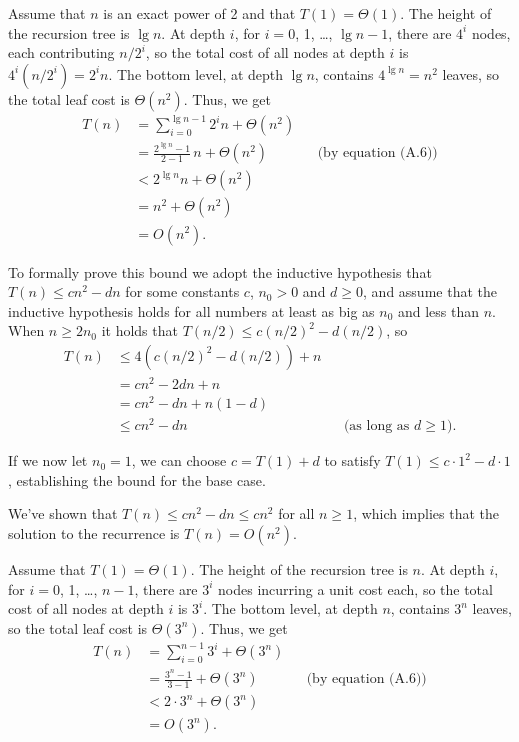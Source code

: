 \subexercise
Assume that $n$ is an exact power of 2 and that $T(1)=\Theta(1)$.
The height of the recursion tree is $\lg n$.
At depth $i$, for $i=0$, 1, \dots, $\lg n-1$, there are $4^i$ nodes, each contributing $n/2^i$, so the total cost of all nodes at depth $i$ is $4^i(n/2^i)=2^in$.
The bottom level, at depth $\lg n$, contains $4^{\lg n}=n^2$ leaves, so the total leaf cost is $\Theta(n^2)$.
Thus, we get
\begin{align*}
    T(n) &= \sum_{i=0}^{\lg n-1}2^in+\Theta(n^2) \\
    &= \frac{2^{\lg n}-1}{2-1}\,n+\Theta(n^2) && \text{(by equation (A.6))} \\[1mm]
    &< 2^{\lg n}n+\Theta(n^2) \\
    &= n^2+\Theta(n^2) \\
    &= O(n^2).
\end{align*}

To formally prove this bound we adopt the inductive hypothesis that $T(n)\le cn^2-dn$ for some constants $c$, $n_0>0$ and $d\ge0$, and assume that the inductive hypothesis holds for all numbers at least as big as $n_0$ and less than $n$.
When $n\ge2n_0$ it holds that $T(n/2)\le c(n/2)^2-d(n/2)$, so
\begin{align*}
    T(n) &\le 4(c(n/2)^2-d(n/2))+n \\
    &= cn^2-2dn+n \\
    &= cn^2-dn+n(1-d) \\
    &\le cn^2-dn && \text{(as long as $d\ge1$)}.
\end{align*}

If we now let $n_0=1$, we can choose $c=T(1)+d$ to satisfy $T(1)\le c\cdot1^2-d\cdot1$, establishing the bound for the base case.

We've shown that $T(n)\le cn^2-dn\le cn^2$ for all $n\ge1$, which implies that the solution to the recurrence is $T(n)=O(n^2)$.

\subexercise
Assume that $T(1)=\Theta(1)$.
The height of the recursion tree is $n$.
At depth $i$, for $i=0$, 1, \dots, $n-1$, there are $3^i$ nodes incurring a unit cost each, so the total cost of all nodes at depth $i$ is $3^i$.
The bottom level, at depth $n$, contains $3^n$ leaves, so the total leaf cost is $\Theta(3^n)$.
Thus, we get
\begin{align*}
    T(n) &= \sum_{i=0}^{n-1}3^i+\Theta(3^n) \\[1mm]
    &= \frac{3^n-1}{3-1}+\Theta(3^n) && \text{(by equation (A.6))} \\[1mm]
    &< 2\cdot3^n+\Theta(3^n) \\
    &= O(3^n).
\end{align*}

